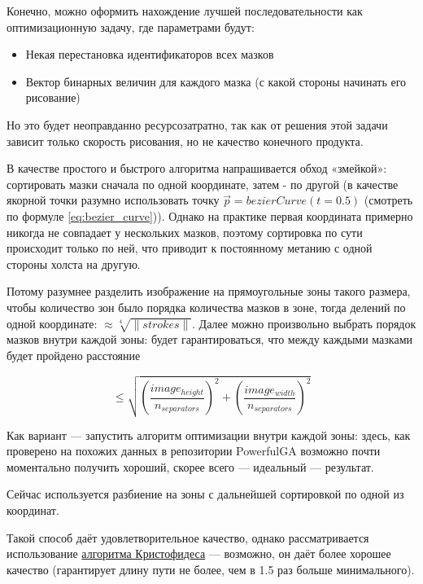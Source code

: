 Конечно, можно оформить нахождение лучшей последовательности как оптимизационную задачу,
где параметрами будут:
\begin{itemize}
    \item Некая перестановка идентификаторов всех мазков
    \item Вектор бинарных величин для каждого мазка (с какой стороны начинать его рисование)
\end{itemize}

Но это будет неоправданно ресурсозатратно, так как от решения этой задачи зависит только скорость рисования, но не качество конечного продукта.

В качестве простого и быстрого алгоритма напрашивается обход «змейкой»: сортировать мазки сначала по одной координате, затем - по другой
(в качестве якорной точки разумно использовать точку $\vec{p} = bezierCurve(t = 0.5)$ (смотреть по формуле \ref{eq:bezier_curve})).
Однако на практике первая координата примерно никогда не совпадает у нескольких мазков, поэтому сортировка по сути происходит только по ней,
что приводит к постоянному метанию с одной стороны холста на другую.

Потому разумнее разделить изображение на прямоугольные зоны такого размера,
чтобы количество зон было порядка количества мазков в зоне, тогда делений по одной координате: $\approx \sqrt[4]{\lVert strokes \rVert}$.
Далее можно произвольно выбрать порядок мазков внутри каждой зоны: будет гарантироваться, что между каждыми мазками будет пройдено расстояние

\begin{equation}\label{eq:movement_restriction}
    \leq \sqrt{\left( \frac{image_{height}}{n_{separators}} \right)^2 + \left( \frac{image_{width}}{n_{separators}} \right)^2}
\end{equation}

Как вариант — запустить алгоритм оптимизации внутри каждой зоны: здесь, как проверено на похожих данных в репозитории PowerfulGA
возможно почти моментально получить хороший, скорее всего — идеальный — результат.

Сейчас используется разбиение на зоны с дальнейшей сортировкой по одной из координат.

Такой способ даёт удовлетворительное качество, однако рассматривается использование
\href{https://en.wikipedia.org/wiki/Christofides_algorithm}{алгоритма Кристофидеса} —
возможно, он даёт более хорошее качество (гарантирует длину пути не более, чем в 1.5 раз больше минимального).

